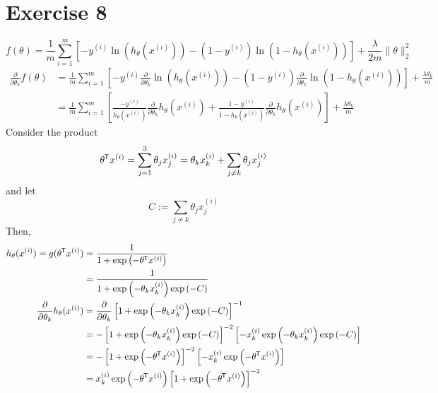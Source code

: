 \documentclass[letterpaper]{amsart}
\newcommand*{\tran}{^{\mkern-1.5mu\mathsf{T}}}
\begin{document}
\section*{Exercise 8}
\begin{equation*}
  f(\theta)
  =
  \frac{1}{m}
  \sum_{i=1}^m
  \left[
    -y^{(i)}
    \ln\left(h_\theta(x^{(i)})\right)
    -(1 - y^{(i)})
    \ln\left(1-h_\theta(x^{(i)})\right)
  \right]
  + \frac{\lambda}{2m}
  \|\theta\|_2^2
\end{equation*}
\begin{align*}
  \frac{\partial}{\partial\theta_k}
  f(\theta)
  &=
  \frac{1}{m}
  \sum_{i=1}^m
    \left[
    -y^{(i)}
  \frac{\partial}{\partial\theta_k}
    \ln\left(h_\theta(x^{(i)})\right)
  -
    (1 - y^{(i)})
  \frac{\partial}{\partial\theta_k}
    \ln\left(1 - h_\theta(x^{(i)})\right)
  \right]
  + \frac{\lambda\theta_k}{m}
  \\
  &=
  \frac{1}{m}
  \sum_{i=1}^m
    \left[
    \frac
    {-y^{(i)}}
    {h_\theta(x^{(i)})}
  \frac{\partial}{\partial\theta_k}
    h_\theta(x^{(i)})
  +
    \frac
    {1 - y^{(i)}}
    {1 - h_\theta\left(x^{(i)}\right)}
  \frac{\partial}{\partial\theta_k}
    h_\theta(x^{(i)})
  \right]
  + \frac{\lambda\theta_k}{m}
\end{align*}
Consider the product
\begin{equation*}
\theta\tran x^{(i)}
= \sum_{j=1}^3\theta_jx_j^{(i)}
= \theta_kx_k^{(i)}
+ \sum_{j\neq k}\theta_jx_j^{(i)}
\end{equation*}
and let
\begin{equation*}
C:=\sum_{j\neq k}\theta_jx_j^{(i)}
\end{equation*}
Then,
\begin{align*}
  h_\theta(x^{(i)})
  =g(\theta\tran x^{(i)})
  &= \frac{1}{1 + \exp\left(-\theta \tran x^{(i)}\right)}
    \\
  &= \frac{1}
    {1 + \exp\left(-\theta_kx_k^{(i)}\right)
    \exp\left(-C\right)}
    \\
  \frac{\partial}{\partial\theta_k}
  h_\theta(x^{(i)})
  &=
  \frac{\partial}{\partial\theta_k}
  \left[
    1 + \exp\left(-\theta_kx_k^{(i)}\right)
    \exp\left(-C\right)
  \right]^{-1}
  \\
  &=
  -\left[
    1 + \exp\left(-\theta_kx_k^{(i)}\right)
    \exp \left(-C\right)
  \right]^{-2}
  \left[
    -x_k^{(i)}
    \exp\left(-\theta_kx_k^{(i)}\right)
    \exp\left(-C\right)
  \right]
    \\
  &=
  -\left[
    1 + \exp\left(-\theta\tran x^{(i)}\right)
  \right]^{-2}
  \left[
    -x_k^{(i)}
    \exp\left(-\theta\tran x^{(i)}\right)
  \right]
    \\
  &=
    x_k^{(i)}
    \exp\left(-\theta\tran x^{(i)}\right)
  \left[
    1 + \exp\left(-\theta\tran x^{(i)}\right)
  \right]^{-2}
\end{align*}
\end{document}
